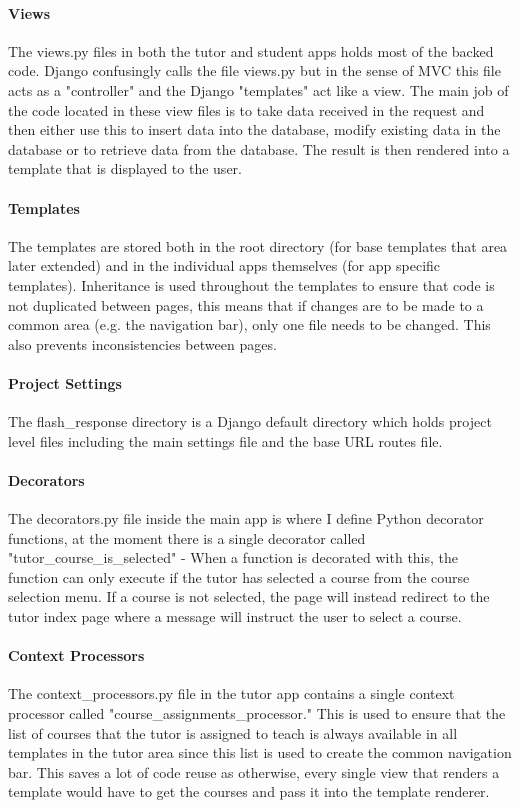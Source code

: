 \documentclass[10pt]{report}
\begin{document}
	\paragraph{Views}
	The views.py files in both the tutor and student apps holds most of the backed code. Django
	confusingly calls the file views.py but in the sense of MVC this file acts as a "controller" and the
	Django "templates" act like a view.  The main job of the code located in these view files is to take
	data received in the request and then either use this to insert data into the database, modify
	existing data in the database or to retrieve data from the database.  The result is then rendered into
	a template that is displayed to the user.
	
	\paragraph{Templates}
	The templates are stored both in the root directory (for base templates that area later extended) and
	in the individual apps themselves (for app specific templates).  Inheritance is used throughout the
	templates to ensure that code is not duplicated between pages, this means that if changes are to be
	made to a common area (e.g. the navigation bar), only one file needs to be changed.  This also
	prevents inconsistencies between pages.
	
	\paragraph{Project Settings}
	The flash\_response directory is a Django default directory which holds project level files including
	the main settings file and the base URL routes file.
	
	\paragraph{Decorators}
	The decorators.py file inside the main app is where I define Python decorator functions, at the moment
	there is a single decorator called "tutor\_course\_is\_selected" - When a function is decorated with
	this, the function can only execute if the tutor has selected a course from the course selection menu.
	If a course is not selected, the page will instead redirect to the tutor index page where a message
	will instruct the user to select a course.
	
	\paragraph{Context Processors}
	The context\_processors.py file in the tutor app contains a single context processor called 
	"course\_assignments\_processor."  This is used to ensure that the list of courses that the tutor
	is assigned to teach is always available in all templates in the tutor area since this list is used
	to create the common navigation bar.  This saves a lot of code reuse as otherwise, every single view
	that renders a template would have to get the courses and pass it into the template renderer.
	
\end{document}
